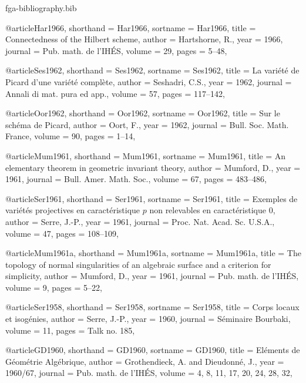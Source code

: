 \begin{filecontents*}{fga-bibliography.bib}

  @article{Har1966,
  shorthand = {Har1966},
  sortname = {Har1966},
  title = {Connectedness of the {{Hilbert}} scheme},
  author = {Hartshorne, R.},
  year = {1966},
  journal = {Pub. math. de l'IH\'{E}S},
  volume = {29},
  pages = {5--48},
}

    @article{Ses1962,
  shorthand = {Ses1962},
  sortname = {Ses1962},
  title = {La vari\'{e}t\'{e} de Picard d'une vari\'{e}t\'{e} compl\`{e}te},
  author = {Seshadri, C.S.},
  year = {1962},
  journal = {Annali di mat. pura ed app.},
  volume = {57},
  pages = {117--142},
}

    @article{Oor1962,
  shorthand = {Oor1962},
  sortname = {Oor1962},
  title = {Sur le sch\'{e}ma de Picard},
  author = {Oort, F.},
  year = {1962},
  journal = {Bull. Soc. Math. France},
  volume = {90},
  pages = {1--14},
}

    @article{Mum1961,
  shorthand = {Mum1961},
  sortname = {Mum1961},
  title = {An elementary theorem in geometric invariant theory},
  author = {Mumford, D.},
  year = {1961},
  journal = {Bull. Amer. Math. Soc.},
  volume = {67},
  pages = {483--486},
}

    @article{Ser1961,
  shorthand = {Ser1961},
  sortname = {Ser1961},
  title = {Exemples de vari\'{e}t\'{e}s projectives en caract\'{e}ristique $p$ non relevables en caract\'{e}ristique 0},
  author = {Serre, J.-P.},
  year = {1961},
  journal = {Proc. Nat. Acad. Sc. U.S.A.},
  volume = {47},
  pages = {108--109},
}

    @article{Mum1961a,
  shorthand = {Mum1961a},
  sortname = {Mum1961a},
  title = {The topology of normal singularities of an algebraic surface and a criterion for simplicity},
  author = {Mumford, D.},
  year = {1961},
  journal = {Pub. math. de l'IH\'{E}S},
  volume = {9},
  pages = {5--22},
}

    @article{Ser1958,
  shorthand = {Ser1958},
  sortname = {Ser1958},
  title = {Corps locaux et isog\'{e}nies},
  author = {Serre, J.-P.},
  year = {1960},
  journal = {S\'{e}minaire Bourbaki},
  volume = {11},
  pages = {Talk no. 185},
}

    @article{GD1960,
  shorthand = {GD1960},
  sortname = {GD1960},
  title = {{{El\'{e}ments de G\'{e}om\'{e}trie Alg\'{e}brique}}},
  author = {Grothendieck, A. and Dieudonn\'{e}, J.},
  year = {1960/67},
  journal = {Pub. math. de l'IH\'{E}S},
  volume = {4, 8, 11, 17, 20, 24, 28, 32},
}


\end{filecontents*}
